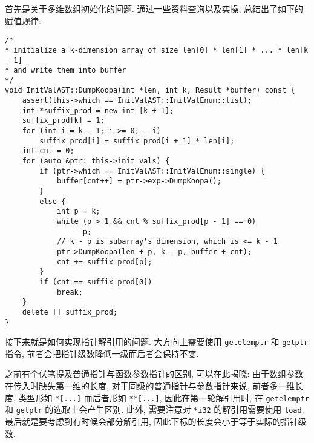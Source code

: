 \documentclass[8pt]{article}
\theoremstyle{compact}
\begin{document}
首先是关于多维数组初始化的问题. 通过一些资料查询以及实操, 总结出了如下的赋值规律:
\begin{verbatim}
/*
* initialize a k-dimension array of size len[0] * len[1] * ... * len[k - 1]
* and write them into buffer
*/
void InitValAST::DumpKoopa(int *len, int k, Result *buffer) const {
    assert(this->which == InitValAST::InitValEnum::list);
    int *suffix_prod = new int [k + 1];
    suffix_prod[k] = 1;
    for (int i = k - 1; i >= 0; --i)
        suffix_prod[i] = suffix_prod[i + 1] * len[i];
    int cnt = 0;
    for (auto &ptr: this->init_vals) {
        if (ptr->which == InitValAST::InitValEnum::single) {
            buffer[cnt++] = ptr->exp->DumpKoopa();
        }
        else {
            int p = k;
            while (p > 1 && cnt % suffix_prod[p - 1] == 0)
                --p;
            // k - p is subarray's dimension, which is <= k - 1
            ptr->DumpKoopa(len + p, k - p, buffer + cnt);
            cnt += suffix_prod[p];
        }
        if (cnt == suffix_prod[0])
            break;
    }
    delete [] suffix_prod;
}       
\end{verbatim}

接下来就是如何实现指针解引用的问题. 大方向上需要使用 \texttt{getelemptr} 和 \texttt{getptr} 指令, 前者会把指针级数降低一级而后者会保持不变.

之前有个伏笔提及普通指针与函数参数指针的区别, 可以在此揭晓: 由于数组参数在传入时缺失第一维的长度, 对于同级的普通指针与参数指针来说, 前者多一维长度, 类型形如 \texttt{*[...]} 而后者形如 \texttt{**[...]}, 因此在第一轮解引用时, 在 \texttt{getelemptr} 和 \texttt{getptr} 的选取上会产生区别. 此外, 需要注意对 \texttt{*i32} 的解引用需要使用 \texttt{load}. 最后就是要考虑到有时候会部分解引用, 因此下标的长度会小于等于实际的指针级数.
\end{document}
